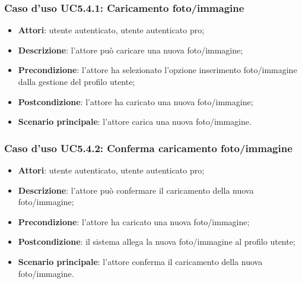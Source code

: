 \subsubsection{Caso d'uso UC5.4.1: Caricamento foto/immagine}

\begin{itemize}
	\item \textbf{Attori}: utente autenticato, utente autenticato pro;
	\item \textbf{Descrizione}: l'attore può caricare una nuova foto/immagine;
	\item \textbf{Precondizione}: l'attore ha selezionato l'opzione inserimento foto/immagine dalla gestione del profilo utente;  
	\item \textbf{Postcondizione}: l'attore ha caricato una nuova foto/immagine;
	\item \textbf{Scenario principale}: l'attore carica una nuova foto/immagine.
\end{itemize}

\subsubsection{Caso d'uso UC5.4.2: Conferma caricamento foto/immagine}

\begin{itemize}
	\item \textbf{Attori}: utente autenticato, utente autenticato pro;
	\item \textbf{Descrizione}: l'attore può confermare il caricamento della nuova foto/immagine;
	\item \textbf{Precondizione}: l'attore ha caricato una nuova foto/immagine;
	\item \textbf{Postcondizione}: il sistema allega la nuova foto/immagine al profilo utente;
	\item \textbf{Scenario principale}: l'attore conferma il caricamento della nuova foto/immagine.
\end{itemize}


